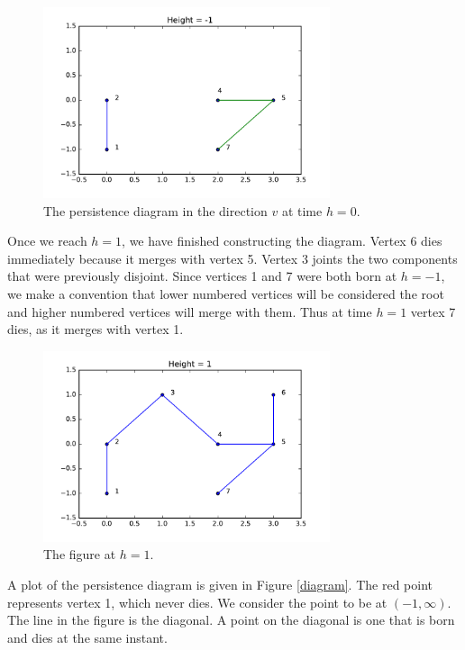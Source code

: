 \documentclass[codesnippet]{jss}
\begin{document}
\begin{figure}
\centering
\includegraphics[width = 0.75\textwidth]{../persist_diag2.pdf}
\caption{\label{persist_diag2} The persistence diagram in the direction $v$ at time $h=0$.}
\end{figure}
Once we reach $h = 1$, we have finished constructing the diagram.  Vertex 6 dies immediately because it merges with vertex 5.  Vertex 3 joints the two components that were previously disjoint.  Since vertices 1 and 7 were both born at $h=-1$, we make a convention that lower numbered vertices will be considered the root and higher numbered vertices will merge with them.  Thus at time $h=1$ vertex 7 dies, as it merges with vertex 1.
\begin{figure}
\centering
\includegraphics[width = 0.75\textwidth]{../persist_diag3.pdf}
\caption{\label{pesist_diag3} The figure at $h=1$.}
\end{figure}
A plot of the persistence diagram is given in Figure \ref{diagram}.  The red point represents vertex 1, which never dies.  We consider the point to be at $(-1,\infty)$.  The line in the figure is the diagonal.  A point on the diagonal is one that is born and dies at the same instant.  
\end{document}
